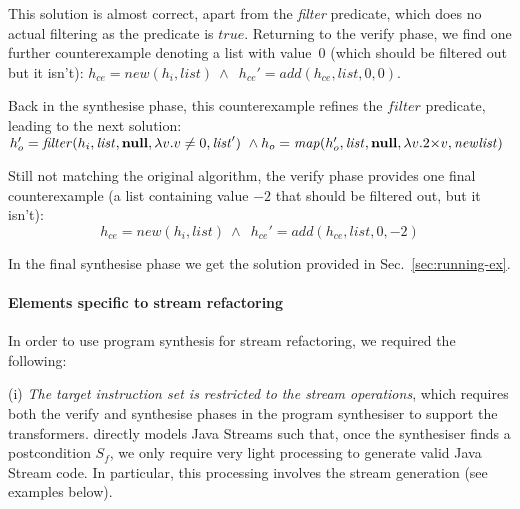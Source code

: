 \documentclass[runningheads,a4paper]{llncs}
\begin{document}
%
This solution is almost correct, apart from the {\em filter} predicate,
which does no actual filtering as the predicate is $true$.  Returning to the
{\sc verify} phase, we find one further counterexample denoting a list with
value~0 (which should be filtered out but it isn't):
%
$h_{ce} {=} \mathit{new}(h_i, list) ~\wedge \enspace h_{ce}' {=} \mathit{add}(h_{ce}, list, 0, 0)$.

Back in the {\sc synthesise} phase, this counterexample refines the $filter$ predicate,
leading to the next solution:\\
$h_o' = \mathit{filter}(h_i, \mathit{list}, \mathbf{null}, \lambda v. v \neq 0, \mathit{list}') ~\wedge
h_o = \mathit{map}(h_o', \mathit{list}, \mathbf{null}, \lambda v.2 {\times} v, \mathit{newlist})$

Still not matching the original algorithm, the {\sc verify} phase provides one
final counterexample (a list containing value $-2$ that should be filtered out, but it isn't):
$$h_{ce} {=} \mathit{new}(h_i, list) ~\wedge \enspace h_{ce}' {=} \mathit{add}(h_{ce}, list, 0, -2)$$

In the final {\sc synthesise} phase we get the solution provided in
Sec.~\ref{sec:running-ex}.

\paragraph{Elements specific to stream refactoring}
In order to use program synthesis for stream refactoring, we required 
the following:

(i) {\em The target instruction set is \logic restricted to the stream operations},
which requires 
both the {\sc verify} and {\sc synthesise} phases in the program synthesiser 
to support the \logic transformers.  
\logic directly models Java Streams such that, 
once the synthesiser finds a postcondition $S_f$, 
we only require very light processing to generate valid Java Stream code.
In particular, this processing involves the stream generation (see examples below). 
\end{document}
